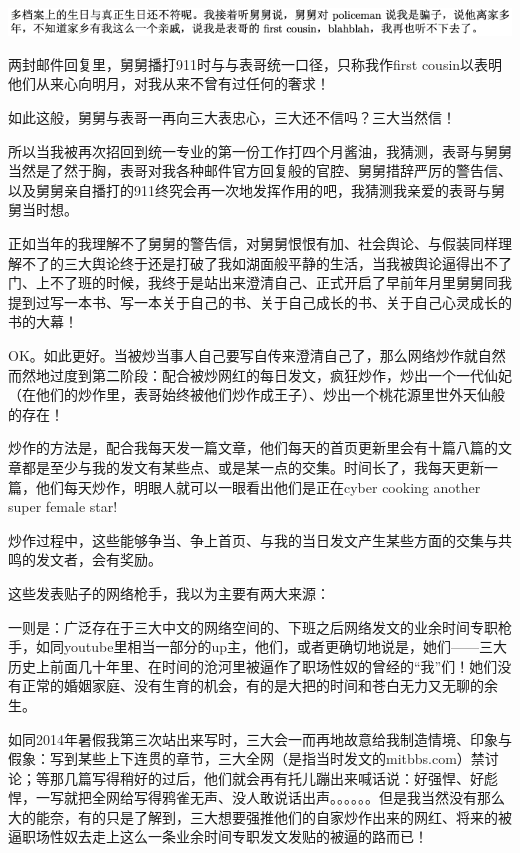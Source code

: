 \documentclass[9pt, b5paper]{article}
\begin{document}
\begin{center}
\includegraphics[width=.9\linewidth]{./pic/backups_plans_20210412_172523.png}
\end{center}

两封邮件回复里，舅舅播打911时与与表哥统一口径，只称我作first cousin以表明他们从来心向明月，对我从来不曾有过任何的奢求！

如此这般，舅舅与表哥一再向三大表忠心，三大还不信吗？三大当然信！

所以当我被再次招回到统一专业的第一份工作打四个月酱油，我猜测，表哥与舅舅当然是了然于胸，表哥对我各种邮件官方回复般的官腔、舅舅措辞严厉的警告信、以及舅舅亲自播打的911终究会再一次地发挥作用的吧，我猜测我亲爱的表哥与舅舅当时想。 

正如当年的我理解不了舅舅的警告信，对舅舅恨恨有加、社会舆论、与假装同样理解不了的三大舆论终于还是打破了我如湖面般平静的生活，当我被舆论逼得出不了门、上不了班的时候，我终于是站出来澄清自己、正式开启了早前年月里舅舅同我提到过写一本书、写一本关于自己的书、关于自己成长的书、关于自己心灵成长的书的大幕！

OK。如此更好。当被炒当事人自己要写自传来澄清自己了，那么网络炒作就自然而然地过度到第二阶段：配合被炒网红的每日发文，疯狂炒作，炒出一个一代仙妃（在他们的炒作里，表哥始终被他们炒作成王子）、炒出一个桃花源里世外天仙般的存在！

炒作的方法是，配合我每天发一篇文章，他们每天的首页更新里会有十篇八篇的文章都是至少与我的发文有某些点、或是某一点的交集。时间长了，我每天更新一篇，他们每天炒作，明眼人就可以一眼看出他们是正在cyber cooking another super female star!

炒作过程中，这些能够争当、争上首页、与我的当日发文产生某些方面的交集与共鸣的发文者，会有奖励。 

这些发表贴子的网络枪手，我以为主要有两大来源：

一则是：广泛存在于三大中文的网络空间的、下班之后网络发文的业余时间专职枪手，如同youtube里相当一部分的up主，他们，或者更确切地说是，她们——三大历史上前面几十年里、在时间的沧河里被逼作了职场性奴的曾经的“我”们！她们没有正常的婚姻家庭、没有生育的机会，有的是大把的时间和苍白无力又无聊的余生。

如同2014年暑假我第三次站出来写时，三大会一而再地故意给我制造情境、印象与假象：写到某些上下连贯的章节，三大全网（是指当时发文的mitbbs.com）禁讨论；等那几篇写得稍好的过后，他们就会再有托儿蹦出来喊话说：好强悍、好彪悍，一写就把全网给写得鸦雀无声、没人敢说话出声。。。。。。但是我当然没有那么大的能奈，有的只是了解到，三大想要强推他们的自家炒作出来的网红、将来的被逼职场性奴去走上这么一条业余时间专职发文发贴的被逼的路而已！
\end{document}
